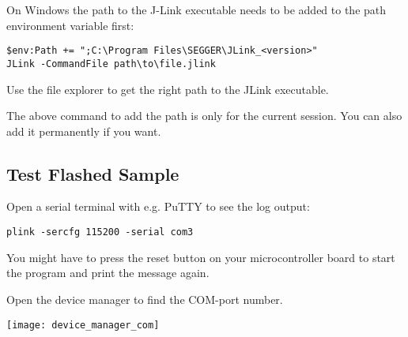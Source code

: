 On Windows the path to the J-Link executable needs to be added to the path environment variable first:

\begin{lstlisting}
$env:Path += ";C:\Program Files\SEGGER\JLink_<version>"
JLink -CommandFile path\to\file.jlink
\end{lstlisting}

\begin{infobox}
  Use the file explorer to get the right path to the JLink executable.
\end{infobox}

\begin{infobox}
  The above command to add the path is only for the current session.
  You can also add it permanently if you want.
\end{infobox}

\subsection{Test Flashed Sample}

Open a serial terminal with e.g. PuTTY to see the log output:

\begin{lstlisting}
plink -sercfg 115200 -serial com3
\end{lstlisting}

You might have to press the reset button on your microcontroller board to start the program and print the message again.

\begin{infobox}
  Open the device manager to find the COM-port number.
  \begin{center}
    \texttt{[image: device\_manager\_com]}
  \end{center}
\end{infobox}
